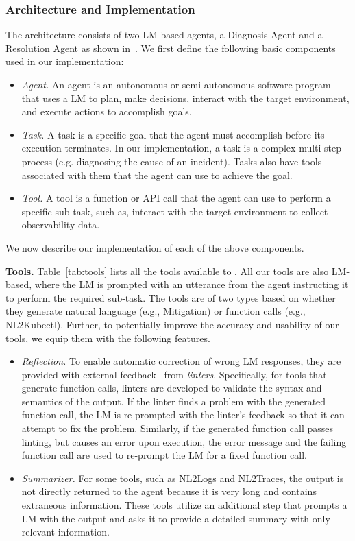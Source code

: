 \subsubsection{\lumyn Architecture and Implementation}
The \lumyn architecture consists of two LM-based agents, a Diagnosis Agent and a Resolution Agent as shown in~. We first define the following basic components used in our implementation:
\begin{itemize}
    \item \textit{Agent.} An agent is an autonomous or semi-autonomous software program that uses a LM to plan, make decisions, interact with the target environment, and execute actions to accomplish goals.
    \item \textit{Task.} A task is a specific goal that the agent must accomplish before its execution terminates. In our implementation, a task is a complex multi-step process (e.g. diagnosing the cause of an incident). Tasks also have tools associated with them that the agent can use to achieve the goal.
    \item \textit{Tool.} A tool is a function or API call that the agent can use to perform a specific sub-task, such as, interact with the target environment to collect observability data. 
\end{itemize}

We now describe our implementation of each of the above components.


\textbf{Tools.} Table~\ref{tab:tools} lists all the tools available to \lumyn. All our tools are also LM-based, where the LM is prompted with an utterance from the agent instructing it to perform the required sub-task. The tools are of two types based on whether they generate natural language (e.g., Mitigation) or function calls (e.g., NL2Kubectl). Further, to potentially improve the accuracy and usability of our tools, we equip them with the following features.

\begin{itemize}
\item \textit{Reflection.} To enable automatic correction of wrong LM responses, they are provided with external feedback~\cite{pan2023automatically, huang2023large} from \textit{linters}. Specifically, for tools that generate function calls, linters are developed to validate the syntax and semantics of the output. If the linter finds a problem with the generated function call, the LM is re-prompted with the linter's feedback so that it can attempt to fix the problem. Similarly, if the generated function call passes linting, but causes an error upon execution, the error message and the failing function call are used to re-prompt the LM for a fixed function call. 

\item \textit{Summarizer.} For some tools, such as NL2Logs and NL2Traces, the output is not directly returned to the agent because it is very long and contains extraneous information. These tools utilize an additional step that prompts a LM with the output and asks it to provide a detailed summary with only relevant information.
\end{itemize}

